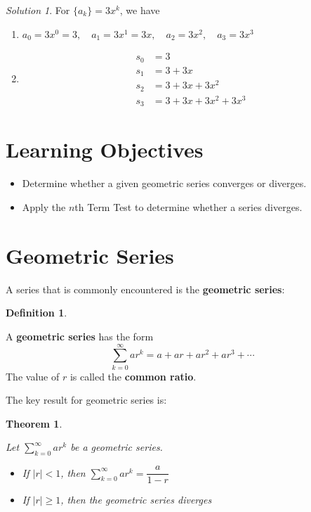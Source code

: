 \documentclass[
]{book}
\providecommand{\tightlist}{%
  \setlength{\itemsep}{0pt}\setlength{\parskip}{0pt}}
\newtheorem{theorem}{Theorem}[chapter]
\theoremstyle{definition}
\newtheorem{definition}{Definition}[chapter]
\theoremstyle{definition}
\theoremstyle{definition}
\theoremstyle{definition}
\theoremstyle{remark}
\newtheorem*{solution}{Solution}
\begin{document}
\begin{solution}

For \(\{a_k\}=3x^k\), we have

\begin{enumerate}
\def\labelenumi{\alph{enumi}.}
\tightlist
\item
  \(a_0=3x^0=3, \quad a_1 =3x^1=3x, \quad a_2=3x^2, \quad a_3=3x^3\)
\item
  \begin{align*}
  s_0 &= 3 \\
  s_1 &= 3+3x \\
  s_2 &= 3+3x +3x^2\\
  s_3 &= 3+3x +3x^2 +3x^3
  \end{align*}
\end{enumerate}

\end{solution}

\hypertarget{learning-objectives-25}{%
\section{Learning Objectives}\label{learning-objectives-25}}

\begin{itemize}
\tightlist
\item
  Determine whether a given geometric series converges or diverges.
\item
  Apply the \(n\)th Term Test to determine whether a series diverges.
\end{itemize}

\hypertarget{geometric-series}{%
\section{Geometric Series}\label{geometric-series}}

A series that is commonly encountered is the \textbf{geometric series}:

\begin{definition}
\protect\hypertarget{def:unlabeled-div-176}{}\label{def:unlabeled-div-176}

A \textbf{geometric series} has the form \[\sum_{k=0}^\infty ar^k = a+ ar+ ar^2+ar^3+\cdots\]
The value of \(r\) is called the \textbf{common ratio}.

\end{definition}

The key result for geometric series is:

\begin{theorem}
\protect\hypertarget{thm:unlabeled-div-177}{}\label{thm:unlabeled-div-177}

Let \(\sum_{k=0}^\infty ar^k\) be a geometric series.

\begin{itemize}
\tightlist
\item
  If \(|r|<1\), then \(\displaystyle \sum_{k=0}^\infty ar^k =\dfrac{a}{1-r}\)
\item
  If \(|r|\geq 1\), then the geometric series diverges
\end{itemize}

\end{theorem}
\end{document}
